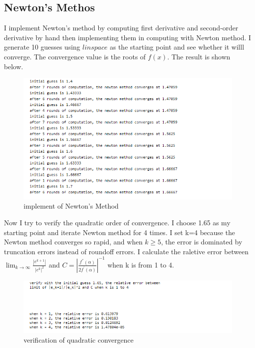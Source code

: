 \documentclass[a4paper]{article}
\begin{document}
\subsection{Newton's Methos}
I implement Newton's method by computing first derivative and second-order derivative by hand then implementing them in computing with Newton method. I generate 10 guesses using $linspace$ as the starting point and see whether it willl converge. The convergence value is the roots of $f(x)$. The result is shown below.

\begin{figure}[H] 
\centering 
\includegraphics[width=1.0\textwidth]{1.2-1.png}
\caption{implement of Newton's Method} 
\label{Fig.1.2-1} 
\end{figure}

Now I try to verify the quadratic order of convergence. I choose 1.65 as my starting point and iterate Newton method for 4 times. I set k=4 because the Newton method converges so rapid, and when $k \geq 5$, the error is dominated by truncation errors instead of roundoff errors. I calculate the raletive error between $\lim_{k \to \infty}\frac{|e^{k+1}|}{|e^{k}|^{2}}$ and $C =\left| \frac{f^{''}(\alpha)}{2f^{'}(\alpha)} \right|^{-1}$ when k is from 1 to 4.

\begin{figure}[H] 
\centering 
\includegraphics[width=1.0\textwidth]{1.2-2.png}
\caption{verification of quadratic convergence} 
\label{Fig.1.2-2} 
\end{figure}
\end{document}
